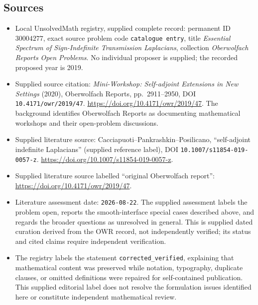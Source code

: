 \documentclass[11pt]{article}
\begin{document}
\subsection{Sources}
\begin{itemize}
\item Local UnsolvedMath registry, supplied complete record: permanent ID \(30004277\), exact source problem code \texttt{catalogue entry}, title \emph{Essential Spectrum of Sign-Indefinite Transmission Laplacians}, collection \emph{Oberwolfach Reports Open Problems}. No individual proposer is supplied; the recorded proposed year is 2019.
\item Supplied source citation: \emph{Mini-Workshop: Self-adjoint Extensions in New Settings} (2020), Oberwolfach Reports, pp.~2911--2950, DOI \texttt{10.4171/owr/2019/47}. \url{https://doi.org/10.4171/owr/2019/47}. The background identifies Oberwolfach Reports as documenting mathematical workshops and their open-problem discussions.
\item Supplied literature source: Cacciapuoti--Pankrashkin--Posilicano, ``self-adjoint indefinite Laplacians'' (supplied reference label), DOI \texttt{10.1007/s11854-019-0057-z}. \url{https://doi.org/10.1007/s11854-019-0057-z}.
\item Supplied literature source labelled ``original Oberwolfach report'': \url{https://doi.org/10.4171/owr/2019/47}.
\item Literature assessment date: \texttt{2026-08-22}. The supplied assessment labels the problem open, reports the smooth-interface special cases described above, and regards the broader questions as unresolved in general. This is supplied dated curation derived from the OWR record, not independently verified; its status and cited claims require independent verification.
\item The registry labels the statement \texttt{corrected\_verified}, explaining that mathematical content was preserved while notation, typography, duplicate clauses, or omitted definitions were repaired for self-contained publication. This supplied editorial label does not resolve the formulation issues identified here or constitute independent mathematical review.
\end{itemize}
\end{document}
